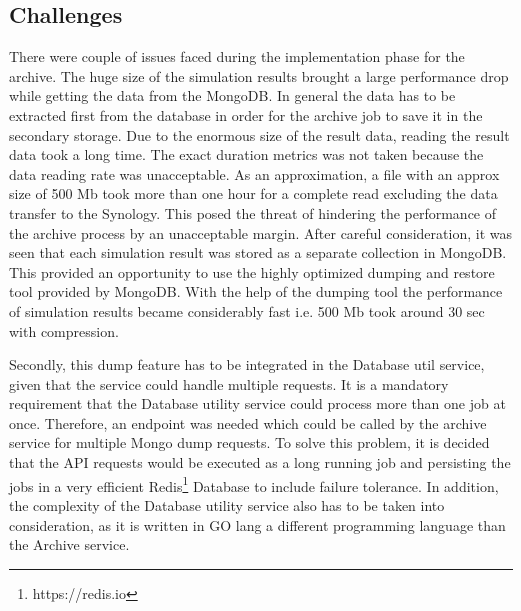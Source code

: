 \subsection{Challenges}
There were couple of issues faced during the implementation phase for the archive. The huge size of the simulation results brought a large
performance drop while getting the data from the MongoDB. In general the data has to be extracted first from the database in order for the archive job
to save it in the secondary storage. Due to the enormous size of the result data, reading the result data took a long time. The exact duration
metrics was not taken because the data reading rate was unacceptable. As an approximation, a file with an approx size of 500 Mb took more than one hour 
for a complete read excluding the data transfer to the Synology. This posed the threat of hindering the performance of the archive process by an unacceptable margin.
After careful consideration, it was seen that each simulation result was stored as a separate collection in MongoDB. This provided an opportunity to use
the highly optimized dumping and restore tool provided by MongoDB. With the help of the dumping tool the performance of simulation results became considerably fast i.e.
500 Mb took around 30 sec with compression.

Secondly, this dump feature has to be integrated in the Database util service, given that the service could handle multiple requests. It is a mandatory requirement that the Database
utility service could process more than one job at once. Therefore, an endpoint was needed which could be called by the archive service for multiple Mongo dump
requests. To solve this problem, it is decided that the API requests would be executed as a long running job and persisting the jobs in a very efficient 
Redis\footnote{https://redis.io} Database to include failure tolerance. In addition, the complexity of the Database utility service also has to be taken into consideration, as it 
is written in GO lang a different programming language than the Archive service.

